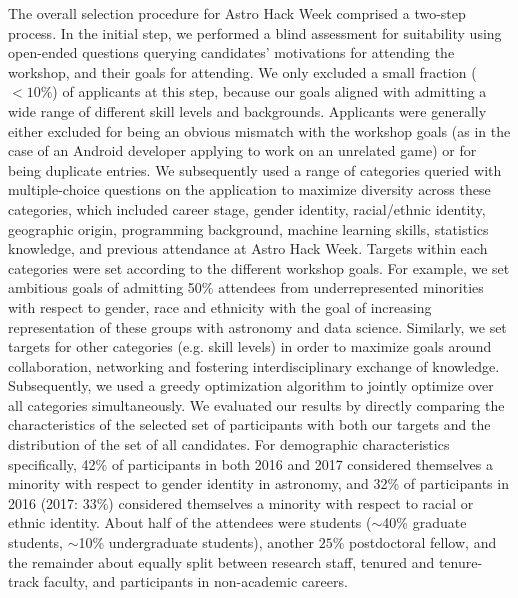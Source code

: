 \documentclass{aastex62}
\begin{document}
The overall selection procedure for Astro Hack Week comprised a two-step process. In the initial step, we performed a blind assessment for suitability using open-ended questions querying candidates' motivations for attending the workshop, and their goals for attending. We only excluded a small fraction ($<10\%$) of applicants at this step, because our goals aligned with admitting a wide range of different skill levels and backgrounds. Applicants were generally either excluded for being an obvious mismatch with the workshop goals (as in the case of an Android developer applying to work on an unrelated game) or for being duplicate entries. We subsequently used a range of categories queried with multiple-choice questions  on the application to maximize diversity across these categories, which included career stage, gender identity, racial/ethnic identity, geographic origin, programming background, machine learning skills, statistics knowledge, and previous attendance at Astro Hack Week. Targets within each categories were set according to the different workshop goals. For example, we set ambitious goals of admitting 50\% attendees from underrepresented minorities with respect to gender, race and ethnicity with the goal of increasing representation of these groups with astronomy and data science. Similarly, we set targets for other categories (e.g. skill levels) in order to maximize goals around collaboration, networking and fostering interdisciplinary exchange of knowledge. Subsequently, we used a greedy optimization algorithm to jointly optimize over all categories simultaneously. We evaluated our results by directly comparing the characteristics of the selected set of participants with both our targets and the distribution of the set of all candidates. For demographic characteristics specifically, 42\% of participants in both 2016 and 2017 considered themselves a minority with respect to gender identity in astronomy, and 32\% of participants in 2016 (2017: 33\%) considered themselves a minority with respect to racial or ethnic identity. About half of the attendees were students ($\sim$40\% graduate students, $\sim$10\% undergraduate students), another $25\%$ postdoctoral fellow, and the remainder about equally split between research staff, tenured and tenure-track faculty, and participants in non-academic careers.
\end{document}
